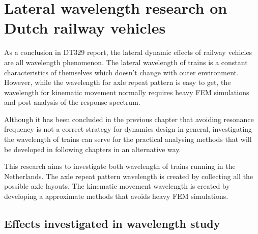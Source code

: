 

\chapter{Lateral wavelength research on Dutch railway vehicles}\label{sec:wavelengthstudy}

As a conclusion in DT329 report, the lateral dynamic effects of railway vehicles are all wavelength phenomenon. The lateral wavelength of trains is a constant characteristics of themselves which doesn't change with outer environment. However, while the wavelength for axle repeat pattern is easy to get, the wavelength for kinematic movement normally requires heavy FEM simulations and post analysis of the response spectrum. 

Although it has been concluded in the previous chapter that avoiding resonance frequency is not a correct strategy for dynamics design in general, investigating the wavelength of trains can serve for the practical analysing methods that will be developed in following chapters in an alternative way.

This research aims to investigate both wavelength of trains running in the Netherlands. The axle repeat pattern wavelength is created by collecting all the possible axle layouts. The kinematic movement wavelength is created by developing a approximate methods that avoids heavy FEM simulations. 


\section{Effects investigated in wavelength study}


